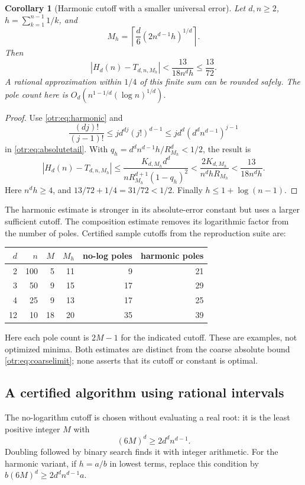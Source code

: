 \documentclass[11pt,a4paper]{article}
\newtheorem{corollary}[theorem]{Corollary}
\theoremstyle{definition}\newtheorem{definition}[theorem]{Definition}
\theoremstyle{remark}\newtheorem{remark}[theorem]{Remark}
\newcommand{\ceil}[1]{\left\lceil #1\right\rceil}
\begin{document}
\begin{corollary}[Harmonic cutoff with a smaller universal error]\label{otr:cor:harmonic}
Let $d,n\ge2$, $h=\sum_{k=1}^{n-1}1/k$, and
\[
 M_h=\ceil{\frac d6(2n^{d-1}h)^{1/d}}.
\]
Then
\[
 |H_d(n)-T_{d,n,M_h}|<\frac{13}{18n^dh}\le\frac{13}{72}.
\]
A rational approximation within $1/4$ of this finite sum can be rounded safely. The pole count here is $O_d(n^{1-1/d}(\log n)^{1/d})$.
\end{corollary}
\begin{proof}
Use \eqref{otr:eq:harmonic} and
\[
 \frac{(dj)!}{(j-1)!}\le j d^{dj}(j!)^{d-1}
 \le j d^d(d^dn^{d-1})^{j-1}
\]
in \eqref{otr:eq:absolutetail}. With $q_h=d^dn^{d-1}h/R_{M_h}^d<1/2$, the result is
\[
 |H_d(n)-T_{d,n,M_h}|
 \le\frac{K_{d,M_h}d^d}{nR_{M_h}^{d+1}(1-q_h)^2}
 <\frac{2K_{d,M_h}}{n^dhR_{M_h}}<\frac{13}{18n^dh}.
\]
Here $n^dh\ge4$, and $13/72+1/4=31/72<1/2$. Finally $h\le1+\log(n-1)$.
\end{proof}

The harmonic estimate is stronger in its absolute-error constant but uses a larger sufficient cutoff. The composition estimate removes its logarithmic factor from the number of poles. Certified sample cutoffs from the reproduction suite are:
\begin{center}
\begin{tabular}{rr rr rr}\toprule
$d$&$n$&$M$&$M_h$&no-log poles&harmonic poles\\\midrule
2&100&5&11&9&21\\
3&50&9&15&17&29\\
4&25&9&13&17&25\\
12&10&18&20&35&39\\\bottomrule
\end{tabular}
\end{center}
Here each pole count is $2M-1$ for the indicated cutoff. These are examples,
not optimized minima. Both estimates are distinct from the coarse absolute bound \eqref{otr:eq:coarselimit}; none asserts that its cutoff or constant is optimal.

\subsection{A certified algorithm using rational intervals}
The no-logarithm cutoff is chosen without evaluating a real root: it is the least positive integer $M$ with
\[
 (6M)^d\ge2d^dn^{d-1}.
\]
Doubling followed by binary search finds it with integer arithmetic. For the harmonic variant, if $h=a/b$ in lowest terms, replace this condition by
$b(6M)^d\ge2d^dn^{d-1}a$.
\end{document}
